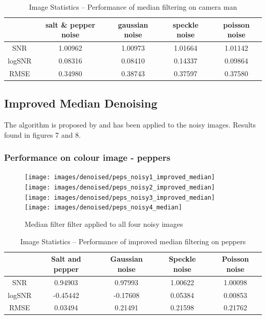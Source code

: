 \documentclass{article}
\begin{document}
\begin{table}[H]
  \centering
  \begin{tabular}{c|c|c|c|c}
    & salt \& pepper noise & gaussian noise &speckle noise & poisson noise\\
    \hline
    SNR & 1.00962 & 1.00973 & 1.01664 & 1.01142 \\
    logSNR & 0.08316 & 0.08410 & 0.14337 & 0.09864 \\
    RMSE & 0.34980 & 0.38743 & 0.37597 & 0.37580 \\
  \end{tabular}
  \caption{Image Statistics -- Performance of median filtering on camera
    man}
\end{table}
%
\subsection{Improved Median Denoising}
\label{subsec:improve-median-denoise}
The algorithm is proposed by \cite{improved-median} and
\cite{Med2012} has been applied to the noisy images. Results found
in figures 7 and 8.
\subsubsection{Performance on colour image - peppers}
\begin{figure}[H]
  \centering
  \texttt{[image: images/denoised/peps\_noisy1\_improved\_median]}
  \texttt{[image: images/denoised/peps\_noisy2\_improved\_median]}
  \texttt{[image: images/denoised/peps\_noisy3\_improved\_median]}
  \texttt{[image: images/denoised/peps\_noisy4\_median]}
  \caption{Median filter filter applied to all four noisy images }
\end{figure}
\begin{table}[H]
  \centering
  \begin{tabular}{c|c|c|c|c}
    & Salt and pepper & Gaussian noise & Speckle noise & Poisson noise \\
    \hline
    SNR & 0.94903 & 0.97993 & 1.00622 & 1.00098 \\
    logSNR & -0.45442 & -0.17608 & 0.05384 & 0.00853 \\
    RMSE & 0.03494 & 0.21491 & 0.21598 & 0.21762 \\
  \end{tabular}
  \caption{Image Statistics -- Performance of improved median
    filtering on peppers}
\end{table}
%
\end{document}
